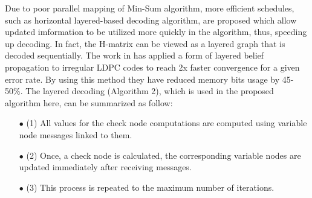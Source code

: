 \documentclass{article}
\begin{document}
Due to poor parallel mapping of Min-Sum algorithm, more efficient schedules, such as horizontal layered-based decoding algorithm, are proposed which allow updated imformation to be utilized more quickly in the algorithm, thus, speeding up decoding\cite{art_layered0, art_layered1}. In fact, the H-matrix can be viewed as a layered graph that is decoded sequentially. The work in \cite{art_gpu_0} has applied a form of layered belief propagation to irregular LDPC codes to reach 2x faster convergence for a given error rate. By using this method they have reduced memory bits usage by 45-50\%. The layered decoding (Algorithm 2), which is used in the proposed algorithm here, can be summarized as follow:
\begin{enumerate}
\item[$\bullet$] (1) All values for the check node computations are computed using variable node messages linked to them.
\item[$\bullet$] (2) Once, a check node is calculated, the corresponding variable nodes are updated immediately after receiving messages.
\item[$\bullet$] (3) This process is repeated to the maximum number of iterations.
\end{enumerate}
\end{document}
